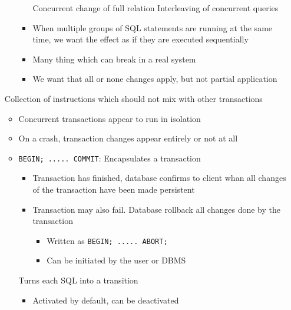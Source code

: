 \begin{itemize}
\begin{itemize}
\begin{itemize}
                     Concurrent change of full relation
                     Interleaving of concurrent queries
                    \item When multiple groups of SQL statements are running at the same time, we want the effect as if they are executed sequentially
                \end{itemize}
                \begin{itemize}
                    \item Many thing which can break in a real system
                    \item We want that all or none changes apply, but not partial application
                \end{itemize}
        \end{itemize}
     Collection of instructions which should not mix with other transactions
        \begin{itemize}
            \item Concurrent transactions appear to run in isolation
            \item On a crash, transaction changes appear entirely or not at all
            \item \verb+BEGIN; ..... COMMIT+: Encapsulates a transaction
                \begin{itemize}
                    \item Transaction has finished, database confirms to client whan all changes of the transaction have been made persistent
                    \item Transaction may also fail. Database rollback all changes done by the transaction
                        \begin{itemize}
                            \item Written as \verb+BEGIN; ..... ABORT;+
                            \item Can be initiated by the user or DBMS
                        \end{itemize}
                \end{itemize}
             Turns each SQL into a transition
                \begin{itemize}
                    \item Activated by default, can be deactivated
                \end{itemize}
        \end{itemize}
\end{itemize}

